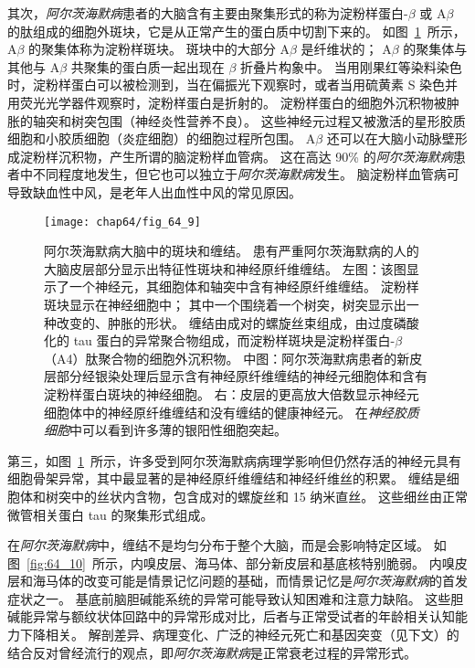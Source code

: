 其次，\textit{阿尔茨海默病}患者的大脑含有主要由聚集形式的称为淀粉样蛋白-$\beta$ 或 A$\beta$ 的肽组成的细胞外斑块，它是从正常产生的蛋白质中切割下来的。
如图~\ref{fig:64_9}~所示，A$\beta$ 的聚集体称为淀粉样斑块。
斑块中的大部分 A$\beta$ 是纤维状的；
A$\beta$ 的聚集体与其他与 A$\beta$ 共聚集的蛋白质一起出现在 $\beta$ 折叠片构象中。
当用刚果红等染料染色时，淀粉样蛋白可以被检测到，当在偏振光下观察时，或者当用硫黄素 S 染色并用荧光光学器件观察时，淀粉样蛋白是折射的。
淀粉样蛋白的细胞外沉积物被肿胀的轴突和树突包围（神经炎性营养不良）。
这些神经元过程又被激活的星形胶质细胞和小胶质细胞（炎症细胞）的细胞过程所包围。
A$\beta$ 还可以在大脑小动脉壁形成淀粉样沉积物，产生所谓的脑淀粉样血管病。
这在高达 90\% 的\textit{阿尔茨海默病}患者中不同程度地发生，但它也可以独立于\textit{阿尔茨海默病}发生。
脑淀粉样血管病可导致缺血性中风，是老年人出血性中风的常见原因。


\begin{figure}[htbp]
	\centering
	\texttt{[image: chap64/fig\_64\_9]}
	\caption{阿尔茨海默病大脑中的斑块和缠结。
		患有严重阿尔茨海默病的人的大脑皮层部分显示出特征性斑块和神经原纤维缠结。
		左图：该图显示了一个神经元，其细胞体和轴突中含有神经原纤维缠结。
		淀粉样斑块显示在神经细胞中；
		其中一个围绕着一个树突，树突显示出一种改变的、肿胀的形状。
		缠结由成对的螺旋丝束组成，由过度磷酸化的 tau 蛋白的异常聚合物组成，而淀粉样斑块是淀粉样蛋白-$\beta$（A4）肽聚合物的细胞外沉积物。
		中图：阿尔茨海默病患者的新皮层部分经银染处理后显示含有神经原纤维缠结的神经元细胞体和含有淀粉样蛋白斑块的神经细胞。
		右：皮层的更高放大倍数显示神经元细胞体中的神经原纤维缠结和没有缠结的健康神经元。
		在\textit{神经胶质细胞}中可以看到许多薄的银阳性细胞突起。}
	\label{fig:64_9}
\end{figure}


第三，如图~\ref{fig:64_9}~所示，许多受到阿尔茨海默病病理学影响但仍然存活的神经元具有细胞骨架异常，其中最显著的是神经原纤维缠结和神经纤维丝的积累。
缠结是细胞体和树突中的丝状内含物，包含成对的螺旋丝和 15 纳米直丝。
这些细丝由正常微管相关蛋白 tau 的聚集形式组成。


在\textit{阿尔茨海默病}中，缠结不是均匀分布于整个大脑，而是会影响特定区域。
如图~\ref{fig:64_10}~所示，内嗅皮层、海马体、部分新皮层和基底核特别脆弱。
内嗅皮层和海马体的改变可能是情景记忆问题的基础，而情景记忆是\textit{阿尔茨海默病}的首发症状之一。
基底前脑胆碱能系统的异常可能导致认知困难和注意力缺陷。
这些胆碱能异常与额纹状体回路中的异常形成对比，后者与正常受试者的年龄相关认知能力下降相关。
解剖差异、病理变化、广泛的神经元死亡和基因突变（见下文）的结合反对曾经流行的观点，即\textit{阿尔茨海默病}是正常衰老过程的异常形式。


